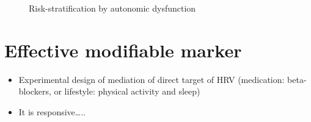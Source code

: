 \documentclass[
  a4paper,
  headsepline=true,
  open=any]{scrbook}
\begin{document}
\begin{figure}

\begin{minipage}[t]{\linewidth}

{\centering 


\caption{Risk-stratification by autonomic dysfunction}

}

\end{minipage}%

\end{figure}

\hypertarget{effective-modifiable-marker}{%
\section{Effective modifiable
marker}\label{effective-modifiable-marker}}

\begin{itemize}
\item
  Experimental design of mediation of direct target of HRV (medication:
  beta-blockers, or lifestyle: physical activity and sleep)
\item
  It is responsive\ldots..
\end{itemize}
\end{document}
